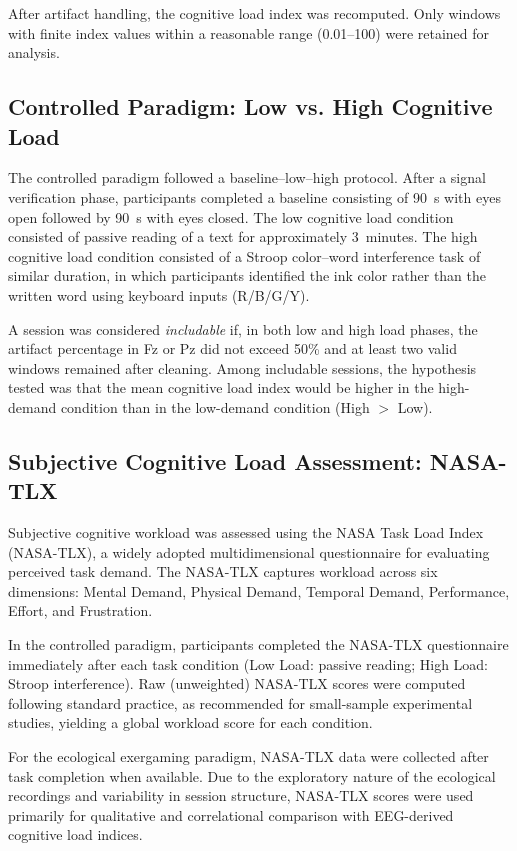 \documentclass[letterpaper, 10 pt, conference]{ieeeconf}
\begin{document}
After artifact handling, the cognitive load index was recomputed. Only windows with finite index values within a reasonable range (0.01--100) were retained for analysis.

\subsection{Controlled Paradigm: Low vs. High Cognitive Load}
The controlled paradigm followed a baseline--low--high protocol. After a signal verification phase, participants completed a baseline consisting of 90~s with eyes open followed by 90~s with eyes closed. The low cognitive load condition consisted of passive reading of a text for approximately 3~minutes. The high cognitive load condition consisted of a Stroop color--word interference task of similar duration, in which participants identified the ink color rather than the written word using keyboard inputs (R/B/G/Y).

A session was considered \emph{includable} if, in both low and high load phases, the artifact percentage in Fz or Pz did not exceed 50\% and at least two valid windows remained after cleaning. Among includable sessions, the hypothesis tested was that the mean cognitive load index would be higher in the high-demand condition than in the low-demand condition (High $>$ Low).
\subsection{Subjective Cognitive Load Assessment: NASA-TLX}

Subjective cognitive workload was assessed using the NASA Task Load Index (NASA-TLX), a widely adopted multidimensional questionnaire for evaluating perceived task demand. The NASA-TLX captures workload across six dimensions: Mental Demand, Physical Demand, Temporal Demand, Performance, Effort, and Frustration.

In the controlled paradigm, participants completed the NASA-TLX questionnaire immediately after each task condition (Low Load: passive reading; High Load: Stroop interference). Raw (unweighted) NASA-TLX scores were computed following standard practice, as recommended for small-sample experimental studies, yielding a global workload score for each condition.

For the ecological exergaming paradigm, NASA-TLX data were collected after task completion when available. Due to the exploratory nature of the ecological recordings and variability in session structure, NASA-TLX scores were used primarily for qualitative and correlational comparison with EEG-derived cognitive load indices.
\end{document}
